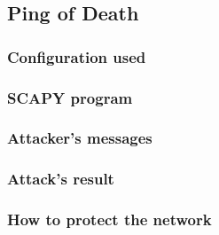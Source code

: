 \subsection{Ping of Death}
\subsubsection{Configuration used}

\subsubsection{SCAPY program}


\subsubsection{Attacker's messages}

\subsubsection{Attack's result}


\subsubsection{How to protect the network}
